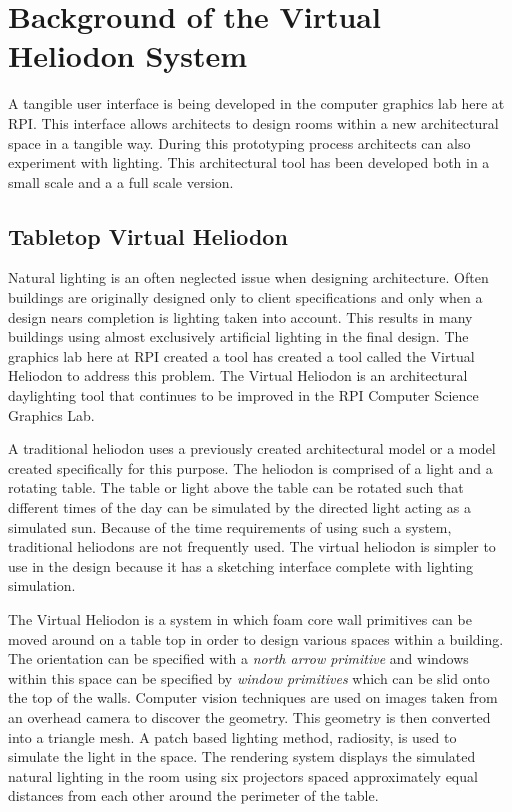 



\chapter{Background of the Virtual Heliodon System}
A tangible user interface is being developed in the computer graphics lab here at RPI.  This interface allows architects to design rooms within a new architectural space in a tangible way.  During this prototyping process architects can also experiment with lighting.  This architectural tool has been developed both in a small scale and a a full scale version.
\section{Tabletop Virtual Heliodon}
\label{tabletop}
Natural lighting is an often neglected issue when designing architecture.  Often buildings are originally designed only to client specifications and only when a design nears completion is lighting taken into account.  This results in many buildings using almost exclusively artificial lighting in the final design.  The graphics lab here at RPI created a tool has created a tool called the Virtual Heliodon to address this problem. The Virtual Heliodon \cite{ShengYYC09} is an architectural daylighting tool that continues to be improved in the RPI Computer Science Graphics Lab. 
 
A traditional heliodon uses a previously created architectural model or a model created specifically for this purpose.  The heliodon is comprised of a light and a rotating table.  The table or light above the table can be rotated such that different times of the day can be simulated by the directed light acting as a simulated sun.  Because of the time requirements of using such a system, traditional heliodons are not frequently used. The virtual heliodon is simpler to use in the design because it has a sketching interface complete with lighting simulation.

The Virtual Heliodon is a system in which foam core wall primitives can be moved around on a table top in order to design various spaces within a building.  The orientation can be specified with a \emph{north arrow primitive} and windows within this space can be specified by \emph{window primitives} which can be slid onto the top of the walls.  Computer vision techniques are used on images taken from an overhead camera to discover the geometry.  This geometry is then converted into a triangle mesh.  A patch based lighting method, radiosity, is used to simulate the light in the space.  The rendering system displays the simulated natural lighting in the room using six projectors spaced approximately equal distances from each other around the perimeter of the table.

